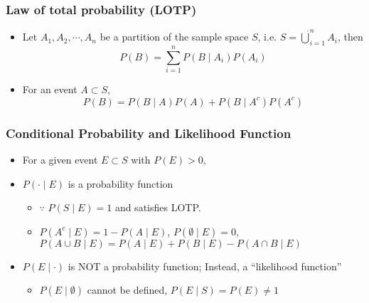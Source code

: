 \subsubsection*{Law of total probability (LOTP)}
\begin{itemize}
    \item Let $A_1,A_2,\cdots,A_n$ be a partition of the sample space $S$, i.e. $S=\dot{\bigcup}_{i=1}^nA_i$, then
    \begin{equation}
        P(B)=\sum_{i=1}^nP(B\mid A_i)P(A_i)
    \end{equation}
    \item For an event $A\subset S$,
    \begin{equation}
        P(B)=P(B\mid A)P(A)+P(B\mid A^c)P(A^c)
    \end{equation}
\end{itemize}

\subsubsection*{Conditional Probability and Likelihood Function}
\begin{itemize}
    \item For a given event $E\subset S$ with $P(E)>0$,
    \item $P(\cdot\mid E)$ is a probability function
    \begin{itemize}
        \item $\because$ $P(S\mid E)=1$ and satisfies LOTP.
        \item $P(A^c\mid E)=1-P(A\mid E)$, $P(\emptyset\mid E)=0$, $P(A\cup B\mid E)=P(A\mid E)+P(B\mid E)-P(A\cap B\mid E)$
    \end{itemize}
    \item $P(E\mid\cdot)$ is NOT a probability function; Instead, a ``likelihood function''
    \begin{itemize}
        \item $P(E\mid\emptyset)$ cannot be defined, $P(E\mid S)=P(E)\neq 1$
    \end{itemize}
\end{itemize}

